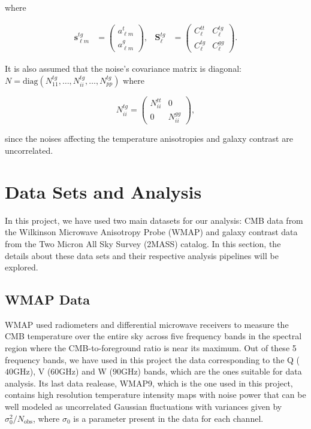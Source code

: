 \documentclass[openany,a4paper,12pt,oneside]{book}
\begin{document}
\begin{spacing}{1.5}
\noindent where 

\begin{align}\label{s_lm=}
	\mathbf{s}_{\ell m}^{tg}&=
	\begin{pmatrix}
	a_{\ell m}^t\\
	a_{\ell m}^g
	\end{pmatrix}, &
	\mathbf{S}_\ell^{tg}&=
	\begin{pmatrix}
	C_\ell^{tt} & C_\ell^{tg}\\
	C_\ell^{tg} & C_\ell^{gg}
	\end{pmatrix}.
\end{align}

It is also assumed that the noise's covariance matrix is diagonal: $N=\text{diag}(N_{11}^{tg}, \dots, N_{ii}^{tg}, \dots, N_{pp}^{tg})$ where

\begin{equation}\label{Niitg}
	N_{ii}^{tg}=
	\begin{pmatrix}
	N_{ii}^{tt} & 0 \\
	0 & N_{ii}^{gg}
	\end{pmatrix},
\end{equation}

\noindent since the noises affecting the temperature anisotropies and galaxy contrast are uncorrelated. 

\section{Data Sets and Analysis}

In this project, we have used two main datasets for our analysis: CMB data from the Wilkinson Microwave Anisotropy Probe (WMAP)\cite{WMAP_results,WMAP_data} and galaxy contrast data from the Two Micron All Sky Survey (2MASS) catalog\cite{2MASS}. In this section, the details about these data sets and their respective analysis pipelines will be explored.

\subsection{WMAP Data}

WMAP used radiometers and differential microwave receivers to measure the CMB temperature over the entire sky across five frequency bands in the spectral region where the
CMB-to-foreground ratio is near its maximum\cite{WMAP_data}. Out of these 5 frequency bands, we have used in this project the data corresponding to the Q ($40\text{GHz}$), V ($60\text{GHz}$) and W ($90\text{GHz}$) bands, which are the ones suitable for data analysis. Its last data realease, WMAP9, which is the one used in this project, contains high resolution temperature intensity maps with noise power that can be well modeled as uncorrelated Gaussian fluctuations with variances given by $\sigma_0^2/N_\text{obs}$, where $\sigma_0$ is a parameter present in the data for each channel.


\end{spacing}
\end{document}
